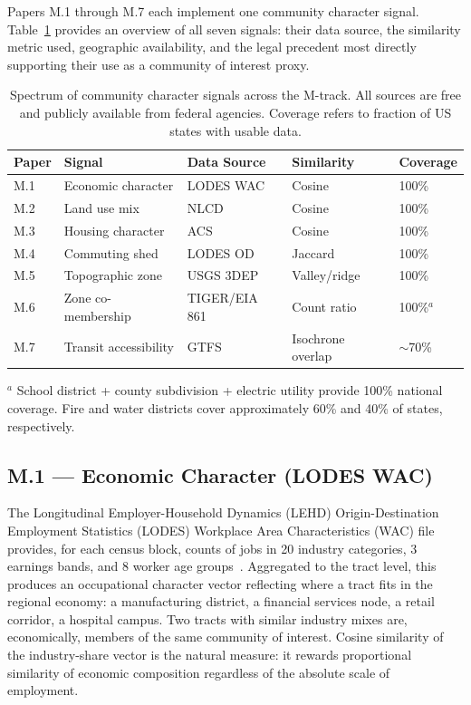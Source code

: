 \label{sec:spectrum}

Papers M.1 through M.7 each implement one community character signal.
Table~\ref{tab:signal-spectrum} provides an overview of all seven signals: their
data source, the similarity metric used, geographic availability, and the legal
precedent most directly supporting their use as a community of interest proxy.

\begin{table}[ht]
\centering
\caption{Spectrum of community character signals across the M-track.
  All sources are free and publicly available from federal agencies.
  Coverage refers to fraction of US states with usable data.}
\label{tab:signal-spectrum}
\small
\begin{tabularx}{\textwidth}{@{}lXlll@{}}
\toprule
\textbf{Paper} & \textbf{Signal} & \textbf{Data Source} & \textbf{Similarity} & \textbf{Coverage} \\
\midrule
M.1 & Economic character & LODES WAC & Cosine & 100\% \\
M.2 & Land use mix & NLCD & Cosine & 100\% \\
M.3 & Housing character & ACS & Cosine & 100\% \\
M.4 & Commuting shed & LODES OD & Jaccard & 100\% \\
M.5 & Topographic zone & USGS 3DEP & Valley/ridge & 100\% \\
M.6 & Zone co-membership & TIGER/EIA 861 & Count ratio & 100\%$^a$ \\
M.7 & Transit accessibility & GTFS & Isochrone overlap & $\sim$70\% \\
\bottomrule
\end{tabularx}
\smallskip
\begin{minipage}{\textwidth}
  \small $^a$ School district + county subdivision + electric utility provide
  100\% national coverage. Fire and water districts cover approximately 60\%
  and 40\% of states, respectively.
\end{minipage}
\end{table}

\subsection{M.1 --- Economic Character (LODES WAC)}

The Longitudinal Employer-Household Dynamics (LEHD) Origin-Destination Employment
Statistics (LODES) Workplace Area Characteristics (WAC) file provides, for each
census block, counts of jobs in 20 industry categories, 3 earnings bands,
and 8 worker age groups~\citep{lodes2022}.
Aggregated to the tract level, this produces an occupational character vector
reflecting where a tract fits in the regional economy: a manufacturing district,
a financial services node, a retail corridor, a hospital campus.
Two tracts with similar industry mixes are, economically, members of the same
community of interest.
Cosine similarity of the industry-share vector is the natural measure: it rewards
proportional similarity of economic composition regardless of the absolute scale
of employment.

